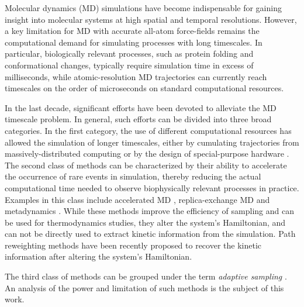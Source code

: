 Molecular dynamics (MD) simulations have become indispensable for gaining
insight into molecular systems at high spatial and temporal resolutions.
However, a key limitation for MD with accurate all-atom force-fields remains
the computational demand for simulating processes with long timescales. In
particular, biologically relevant processes, such as protein folding and
conformational changes, typically require simulation time in excess of
milliseconds, while atomic-resolution MD trajectories can currently reach
timescales on the order of microseconds on standard computational resources. 

In the last decade, significant efforts have been devoted to alleviate the MD
timescale problem.
In general, such efforts can be divided into three broad categories. In the
first category, the use of different computational resources has allowed the
simulation of longer timescales, either by cumulating trajectories from
massively-distributed computing \cite{DistComp-Shirts2000, DistComp-Buch2010}
or by the design of special-purpose hardware \cite{shaw2014anton}.
The second class of methods can be characterized by their ability to
accelerate the occurrence of rare events in simulation, thereby reducing the 
actual computational time needed to observe biophysically relevant
processes in practice. Examples in this class include accelerated MD
\cite{hamelberg2004accelerated}, replica-exchange MD \cite{sugita1999replica}
and metadynamics \cite{laio2008metadynamics}. While these methods improve the
efficiency of sampling and can be used for thermodynamics studies, they 
alter the system's Hamiltonian, and can not be directly used to extract kinetic
information from the simulation. Path reweighting
methods \cite{pathreweight1, pathreweight2, pathreweight3, pathreweight4}
have been recently proposed to recover the kinetic information
after altering the system's Hamiltonian.

The third class of methods can be grouped under the term \emph{adaptive
sampling} \cite{singhal2005error, bowman2010enhanced,
weber2011characterization, Fabritiis-2014, preto2014fast, doerr2016htmd,
AdaptivePELE-Lecina2017, EvolutionCoupling-Shamsi2017, FAST-Bowman-2015, 
Strategies-erros-reduce, plattner2017complete}. An analysis of the power and
limitation of such methods is the subject of this work. 

